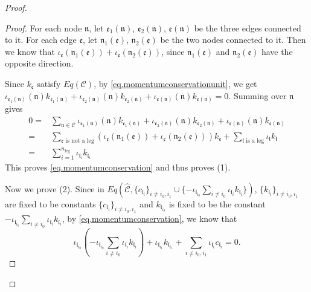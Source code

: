 \begin{proof}
\begin{proof}
For each node $\mathfrak{n}$, let $\mathfrak{e}_1(\mathfrak{n})$, $\mathfrak{e}_2(\mathfrak{n})$, $\mathfrak{e}(\mathfrak{n})$ be the three edges connected to it. For each edge $\mathfrak{e}$, let $\mathfrak{n}_1(\mathfrak{e})$, $\mathfrak{n}_2(\mathfrak{e})$ be the two nodes connected to it. Then we know that $\iota_{\mathfrak{e}}(\mathfrak{n}_1(\mathfrak{e}))+\iota_{\mathfrak{e}}(\mathfrak{n}_2(\mathfrak{e}))$, since $\mathfrak{n}_1(\mathfrak{e})$ and $\mathfrak{n}_2(\mathfrak{e})$ have the opposite direction. 

Since $k_{\mathfrak{e}}$ satisfy $Eq(\mathcal{C})$, by \eqref{eq.momentumconservationunit}, we get $\iota_{\mathfrak{e}_1(\mathfrak{n})}(\mathfrak{n})k_{\mathfrak{e}_1(\mathfrak{n})}+\iota_{\mathfrak{e}_2(\mathfrak{n})}(\mathfrak{n})k_{\mathfrak{e}_2(\mathfrak{n})}+\iota_{\mathfrak{e}(\mathfrak{n})}(\mathfrak{n})k_{\mathfrak{e}(\mathfrak{n})}=0$. Summing over $\mathfrak{n}$ gives 
\begin{equation}
\begin{split}
    0=&\sum_{\mathfrak{n}\in \mathcal{C}}\iota_{\mathfrak{e}_1(\mathfrak{n})}(\mathfrak{n})k_{\mathfrak{e}_1(\mathfrak{n})}+\iota_{\mathfrak{e}_2(\mathfrak{n})}(\mathfrak{n})k_{\mathfrak{e}_2(\mathfrak{n})}+\iota_{\mathfrak{e}(\mathfrak{n})}(\mathfrak{n})k_{\mathfrak{e}(\mathfrak{n})}
    \\
    =& \sum_{\mathfrak{e}\text{ is not a leg}} 
    (\iota_{\mathfrak{e}}(\mathfrak{n}_1(\mathfrak{e}))+\iota_{\mathfrak{e}}(\mathfrak{n}_2(\mathfrak{e}))) k_{\mathfrak{e}}+ \sum_{\mathfrak{l}\text{ is a leg}} 
    \iota_{\mathfrak{l}} k_{\mathfrak{l}}
    \\
    =& \sum_{i=1}^{n_{\text{leg}}} \iota_{\mathfrak{l}_i}k_{\mathfrak{l}_i}
\end{split}
\end{equation}
This proves \eqref{eq.momentumconservation} and thus proves (1).

Now we prove (2). Since in $Eq\left(\widehat{\mathcal{C}}, \{c_{\mathfrak{l}_{i}}\}_{i\ne i_0, i_1}\cup \{-\iota_{\mathfrak{l}_{i_0}}\sum_{i\ne i_0} \iota_{\mathfrak{l}_i}k_{\mathfrak{l}_i}\}\right)$, $\{k_{\mathfrak{l}_{i}}\}_{i\ne i_0, i_1}$ are fixed to be constants $\{c_{\mathfrak{l}_{i}}\}_{i\ne i_0, i_1}$ and $k_{\mathfrak{l}_{i_0}}$ is fixed to be the constant $-\iota_{\mathfrak{l}_{i_0}}\sum_{i\ne i_0} \iota_{\mathfrak{l}_i}k_{\mathfrak{l}_i}$, by \eqref{eq.momentumconservation}, we know that 
\begin{equation}
    \iota_{\mathfrak{l}_{i_0}}\left(-\iota_{\mathfrak{l}_{i_0}}\sum_{i\ne i_0} \iota_{\mathfrak{l}_i}k_{\mathfrak{l}_i}\right)+ \iota_{\mathfrak{l}_{i_1}}k_{\mathfrak{l}_{i_1}}+\sum_{i\ne i_0, i_1} \iota_{\mathfrak{l}_i}c_{\mathfrak{l}_i}=0.
\end{equation}


\end{proof}
\end{proof}
